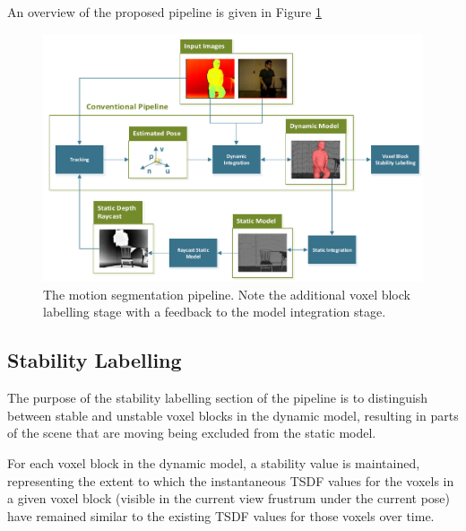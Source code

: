 An overview of the proposed pipeline is given in Figure \ref{fig:moseg_pipeline}
\begin{figure}[ht]
  \label{fig:moseg_pipeline}
  \centering
  \includegraphics[width=\linewidth]{figures/moseg/pipeline.pdf}
  \caption[Motion Segmentation Pipeline]{The motion segmentation pipeline. 
  Note the additional voxel block labelling stage with a feedback to the model 
  integration stage.}
\end{figure}

\subsection{Stability Labelling}
\label{sub:moseg_stability_labelling}
The purpose of the stability labelling section of the pipeline is to distinguish
between stable and unstable voxel blocks in the dynamic model, resulting in
parts of the scene that are moving being excluded from the static model.

For each voxel block in the dynamic model, a stability value is maintained, 
representing the extent to which the instantaneous TSDF values for the voxels 
in a given voxel block (visible in the current view frustrum under the current 
pose) have remained similar to the existing TSDF values for those voxels
over time.

